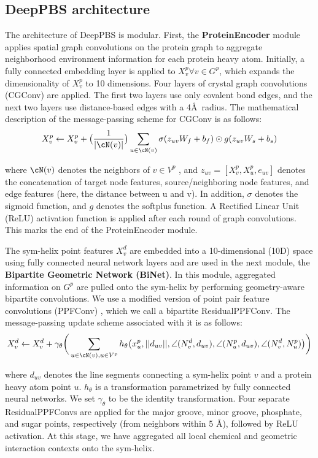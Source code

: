 \subsection{DeepPBS architecture}
The architecture of DeepPBS is modular. First, the \textbf{ProteinEncoder} module applies spatial graph convolutions on the protein graph to aggregate neighborhood environment information for each protein heavy atom. Initially, a fully connected embedding layer is applied to $X_v^p \forall v \in G^p$, which expands the dimensionality of $X_v^p$ to 10 dimensions. Four layers of crystal graph convolutions (CGConv)\citep{Xie2018} are applied. The first two layers use only covalent bond edges, and the next two layers use distance-based edges with a 4\AA\  radius. The mathematical description of the message-passing scheme for CGConv is as follows:   
\begin{align}
X_v^p \leftarrow X_v^p + \big{(}\frac{1}{|\cN(v)|}\big{)}\sum\limits_{u\in\cN(v)}
\sigma(z_{uv}W_f + b_f)\odot g(z_{uv}W_s + b_s)
\end{align}
 
where $\cN(v)$ denotes the neighbors of $v \in V^p$ , and $z_{uv} = [X^p_v,X^p_u,e_{uv}]$ denotes the concatenation of target node features, source/neighboring node features, and edge features (here, the distance between u and v). In addition,  $\sigma$ denotes the sigmoid function, and $g$ denotes the softplus function. A Rectified Linear Unit (ReLU) \citep{Agarap2018} activation function is applied after each round of graph convolutions. This marks the end of the ProteinEncoder module.

The sym-helix point features $X_v^d$ are embedded into a 10-dimensional (10D) space using fully connected neural network layers and are used in the next module, the \textbf{Bipartite Geometric Network (BiNet)}. In this module, aggregated information on $G^p$ are pulled onto the sym-helix by performing geometry-aware bipartite convolutions. We use a modified version of point pair feature convolutions (PPFConv) \citep{Deng2018}, which we call a bipartite ResidualPPFConv. The message-passing update scheme associated with it is as follows: 
\begin{align}
X_v^d \leftarrow X_v^d + \gamma_\theta\bigg{(}\sum\limits_{u\in\cN(v),u\in V^p}h_\theta \big{(}
        x_u^p, ||d_{uv}||, \angle(N_v^d, d_{uv}), \angle(N_u^p,d_{uv}), \angle(N_v^d, N^p_u)
\big{)}
\bigg{)}
\end{align}

where $d_{uv}$ denotes the line segments connecting a sym-helix point $v$ and a protein heavy atom point $u$. $h_\theta$ is a transformation parametrized by fully connected neural networks. We set $\gamma_\theta$ to be the identity transformation. Four separate ResidualPPFConvs are applied for the major groove, minor groove, phosphate, and sugar points, respectively (from neighbors within 5 \AA), followed by ReLU activation. At this stage, we have aggregated all local chemical and geometric interaction contexts onto the sym-helix.

